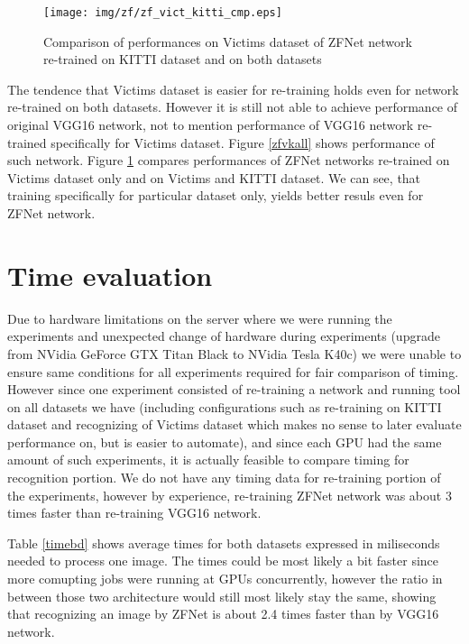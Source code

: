 \begin{figure}[!]
\texttt{[image: img/zf/zf\_vict\_kitti\_cmp.eps]}
\caption[Comparison of performances of ZFNet networks, Victims dataset]{Comparison of performances on Victims dataset of ZFNet network re-trained on KITTI dataset and on both datasets}
\label{zfvkcmp}
\end{figure}

The tendence that Victims dataset is easier for re-training holds even for network re-trained on both datasets. However it is still not able to achieve performance of original VGG16 network, not to mention performance of VGG16 network re-trained specifically for Victims dataset. Figure \ref{zfvkall} shows performance of such network. Figure \ref{zfvkcmp} compares performances of ZFNet networks re-trained on Victims dataset only and on Victims and KITTI dataset. We can see, that training specifically for particular dataset only, yields better resuls even for ZFNet network.

\clearpage
\section{Time evaluation} \label{time}

Due to hardware limitations on the server where we were running the experiments and unexpected change of hardware during experiments (upgrade from NVidia GeForce GTX Titan Black to NVidia Tesla K40c) we were unable to ensure same conditions for all experiments required for fair comparison of timing. However since one experiment consisted of re-training a network and running tool \hyperref[rec]{} on all datasets we have (including configurations such as re-training on KITTI dataset and recognizing of Victims dataset which makes no sense to later evaluate performance on, but is easier to automate), and since each GPU had the same amount of such experiments, it is actually feasible to compare timing for recognition portion. We do not have any timing data for re-training portion of the experiments, however by experience, re-training ZFNet network was about 3 times faster than re-training VGG16 network.

Table \ref{timebd} shows average times for both datasets expressed in miliseconds needed to process one image. The times could be most likely a bit faster since more comupting jobs were running at GPUs concurrently, however the ratio in between those two architecture would still most likely stay the same, showing that recognizing an image by ZFNet is about 2.4 times faster than by VGG16 network.

